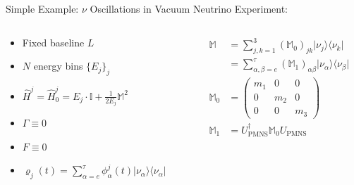 \documentclass[]{beamer}
\begin{document}
\begin{frame}{Simple Example: \(\nu\) Oscillations in Vacuum}
  Neutrino Experiment:
  \begin{columns}
    \begin{column}{0.5\textwidth}
      \begin{itemize}
        \item Fixed baseline \(L\)
        \item \(N\) energy bins \(\{E_j\}_j\)
        \item \(\hat{H}^j = \hat{H}_0^j = E_j \cdot \mathbb{I} + \frac{1}{2E_j} \mathbb{M}^2\)
        \item \(\Gamma \equiv 0\)
        \item \(F \equiv 0\)
        \item \(\varrho_j(t) = \sum_{\alpha = e}^{\tau} \phi_{\alpha}^j(t) \vert \nu_\alpha \rangle \langle \nu_\alpha \vert\)
      \end{itemize}
    \end{column}
    \begin{column}{0.5\textwidth}
      \begin{align*}
        \mathbb{M} &= \sum_{j, k = 1}^{3} (\mathbb{M}_{0})_{jk} \vert \nu_j \rangle \langle \nu_k \vert \\
        &= \sum_{\alpha, \beta = e}^{\tau} (\mathbb{M}_{1})_{\alpha\beta} \vert \nu_\alpha \rangle \langle \nu_\beta \vert \\
        \mathbb{M}_{0} &= \begin{pmatrix}
          m_1 & 0 & 0 \\
          0 & m_2 & 0 \\
          0 & 0 & m_3
        \end{pmatrix} \\
        \mathbb{M}_{1} &= U_{\mathrm{PMNS}}^\dagger \mathbb{M}_{0} U_{\mathrm{PMNS}}
      \end{align*}
    \end{column}
  \end{columns}
\end{frame}
\end{document}

